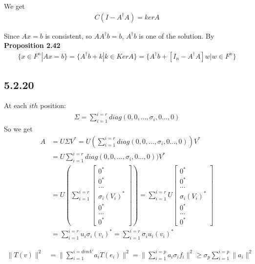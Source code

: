 \documentclass{article}
\begin{document}
We get 
\begin{equation*}
    \begin{split}
        C(I - A^\dagger A) = kerA 
    \end{split}
\end{equation*}

Since $Ax = b$ is consistent, so $AA^\dagger b = b$, $A ^\dagger b$ is one of the solution. By \textbf{Proposition 2.42}
\begin{equation*}
    \begin{split}
        \{ x \in F^n | Ax = b\} = \{ A^\dagger b + k | k \in KerA \} = \{ A^\dagger b + [I_n - A^\dagger A]w | w \in F^n \}
    \end{split}
\end{equation*}

\subsection*{5.2.20}
At each $ith$ position:
\begin{equation*}
    \begin{split}
        \Sigma = \sum_{i = 1}^{i = r} diag(0, 0, ..., \sigma_i, 0..., 0)
    \end{split}
\end{equation*}
So we get 
\begin{equation*}
    \begin{split}
        A & = U \Sigma V^* = U (\sum_{i = 1}^{i = r} diag(0, 0, ..., \sigma_i, 0..., 0))  V^* \\
        & = U\sum_{i = 1}^{i = r} diag(0, 0, ..., \sigma_i, 0..., 0)) V^* \\
        & = U(\sum_{i = 1}^{i = r} \begin{bmatrix}
            0^* \\ 0^* \\ ... \\ \sigma_i(V_i)^* \\ 0^* \\ ... \\ 0^*
        \end{bmatrix}) = \sum_{i = 1}^{i = r} U \begin{bmatrix}
            0^* \\ 0^* \\ ... \\ \sigma_i(V_i)^* \\ 0^* \\ ... \\ 0^*
        \end{bmatrix} \\
        & = \sum_{i = 1}^{i = r} u_i \sigma_i (v_i)^* = \sum_{i = 1}^{i = r} \sigma_i u_i  (v_i)^*
    \end{split}
\end{equation*}


\begin{equation*}
    \begin{split}
        \|T(v)\|^2 & = \|\sum_{i = 1}^{i = dimV} a_iT(e_i)\|^2 = \|\sum_{i = 1}^{i = p} a_i \sigma _i f_i\|^2
            \ge \sigma _p \sum_{i = 1}^{i = p} \|a_i\|^2
    \end{split}
\end{equation*}
\end{document}

